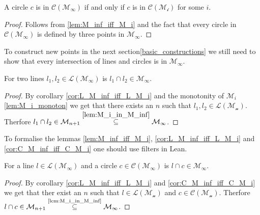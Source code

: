 \begin{corollary}
    \label{cor:C_M_inf_iff_C_M_i}
    \leanok
    A circle $c$ is in $\mathcal{C(M_{\infty})}$ if and only if $c$ is in $\mathcal{C(M_i)}$ for some $i$.
\end{corollary}
\begin{proof}
    Follows from \ref{lem:M_inf_iff_M_i} and the fact that every circle in $\mathcal{C(M_{\infty})}$ is defined by three points in $\mathcal{M_{\infty}}$.
\end{proof}

To construct new points in the next section\ref{basic_constructions} we still need to show that every intersection of lines and circles is in $\mathcal{M}_{\infty}$.
\begin{lemma}
    \label{lem:ill_M_inf}
    \leanok
    For two lines $l_1, l_2 \in \mathcal{L(M_{\infty})}$ is $l_1 \cap l_2 \in \mathcal{M}_{\infty}$.
\end{lemma}
\begin{proof}
    By corollary \ref{cor:L_M_inf_iff_L_M_i} and the monotonity of $\mathcal{M}_i$ \ref{lem:M_i_monoton} we get that there exists an $n$ such that $l_1, l_2 \in \mathcal{L(M_n)}$.
    Therfore $l_1 \cap l_2 \in \mathcal{M}_{n+1} \stackrel{\ref{lem:M_i_in_M_inf}}{\subseteq} \mathcal{M}_{\infty}$.
\end{proof}

\begin{remark}%
    To formalise the lemmas \ref{lem:M_inf_iff_M_i}, \ref{cor:L_M_inf_iff_L_M_i} and \ref{cor:C_M_inf_iff_C_M_i} one should use filters in Lean.
\end{remark}

\begin{lemma}
    \label{lem:ilc_M_inf}
    \leanok
    For a line $l \in \mathcal{L(M_{\infty})}$ and a circle $c \in \mathcal{C(M_{\infty})}$ is $l \cap c \in \mathcal{M}_{\infty}$.
\end{lemma}
\begin{proof}
    By corollary \ref{cor:L_M_inf_iff_L_M_i} and \ref{cor:C_M_inf_iff_C_M_i} we get that ther exist an $n$ such that $l \in \mathcal{L(M_n)}$ and $c \in \mathcal{C(M_n)}$.
    Therfore $l \cap c \in \mathcal{M}_{n+1} \stackrel{\text{\ref{lem:M_i_in_M_inf}}}{\subseteq} \mathcal{M}_{\infty}$.
\end{proof}

